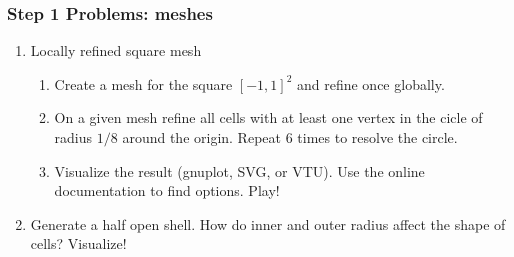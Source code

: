 \begin{frame}
  \frametitle{Step 1 Problems: meshes}
  \begin{enumerate}
    \item Locally refined square mesh
    \begin{enumerate}
    \item Create a mesh for the square $[-1,1]^2$ and refine once globally.
    \item On a given mesh refine all cells with at least one vertex in
      the cicle of radius $1/8$ around the origin. Repeat 6 times to
      resolve the circle.
    \item Visualize the result (gnuplot, SVG, or VTU). Use the online
      documentation to find options. Play!
    \end{enumerate}
  \item Generate a half open shell. How do inner and outer radius
    affect the shape of cells? Visualize!
  \end{enumerate}
\end{frame}
